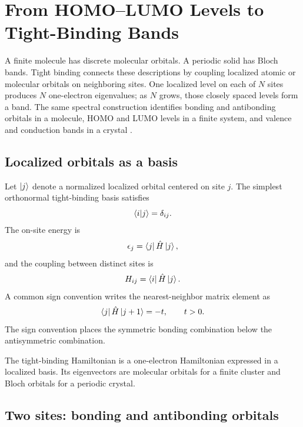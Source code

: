 \chapter{From HOMO--LUMO Levels to Tight-Binding Bands}
\label{ch:homo-lumo-tight-binding}

A finite molecule has discrete molecular orbitals.  A periodic solid has Bloch
bands.  Tight binding connects these descriptions by coupling localized atomic
or molecular orbitals on neighboring sites.  One localized level on each of
$N$ sites produces $N$ one-electron eigenvalues; as $N$ grows, those closely
spaced levels form a band.  The same spectral construction identifies bonding
and antibonding orbitals in a molecule, HOMO and LUMO levels in a finite system,
and valence and conduction bands in a crystal
\cite{kittel2005,yu2010,rudan2015}.

\section{Localized orbitals as a basis}

Let $\ket{j}$ denote a normalized localized orbital centered on site $j$.  The
simplest orthonormal tight-binding basis satisfies
\begin{equation}
  \braket{i|j}=\delta_{ij}.
  \label{eq:tight-binding-orthonormal-basis}
\end{equation}
The on-site energy is
\begin{equation}
  \epsilon_j=\bra{j}\hat H\ket{j},
  \label{eq:tight-binding-onsite-energy}
\end{equation}
and the coupling between distinct sites is
\begin{equation}
  H_{ij}=\bra{i}\hat H\ket{j}.
  \label{eq:tight-binding-hopping-matrix-element}
\end{equation}
A common sign convention writes the nearest-neighbor matrix element as
\begin{equation}
  \bra{j}\hat H\ket{j+1}=-t,
  \qquad t>0.
  \label{eq:tight-binding-hopping-convention}
\end{equation}
The sign convention places the symmetric bonding combination below the
antisymmetric combination.

The tight-binding Hamiltonian is a one-electron Hamiltonian expressed in a
localized basis.  Its eigenvectors are molecular orbitals for a finite cluster
and Bloch orbitals for a periodic crystal.

\section{Two sites: bonding and antibonding orbitals}

